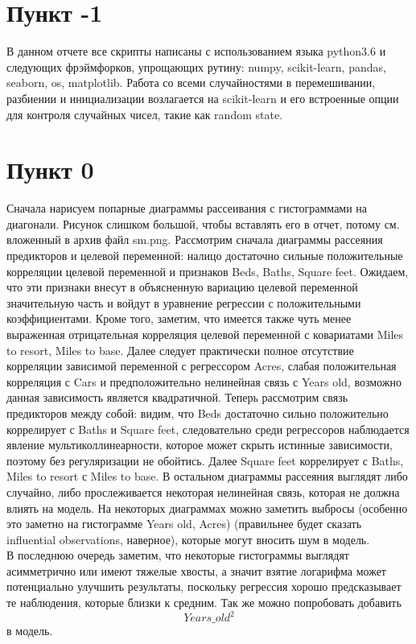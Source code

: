 \documentclass[a4paper, 12pt, oneside]{scrartcl}
\numberwithin{equation}{section}
\numberwithin{table}{section}
\numberwithin{figure}{section}
\begin{document}
\section{Пункт -1}
В данном отчете все скрипты написаны с использованием языка python3.6 и следующих фрэймфорков, упрощающих рутину: numpy, 
scikit-learn, pandas, seaborn, os, matplotlib. Работа со всеми случайностями в перемешивании, разбиении и инициализации 
возлагается на scikit-learn и его встроенные опции для контроля случайных чисел, такие как random state.

\section{Пункт 0}
Сначала нарисуем попарные диаграммы рассеивания с гистограммами на диагонали. Рисунок слишком большой, чтобы вставлять его в отчет, потому
см. вложенный в архив файл sm.png. Рассмотрим сначала диаграммы рассеяния предикторов и целевой переменной: налицо достаточно сильные 
положительные корреляции целевой переменной и признаков Beds, Baths, Square feet. Ожидаем, что эти признаки внесут в объясненную 
вариацию целевой переменной значительную часть и войдут в уравнение регрессии с положительными коэффициентами. Кроме того, 
заметим, что имеется также чуть менее выраженная отрицательная корреляция целевой переменной с ковариатами Miles to resort, Miles to base.
Далее следует практически полное отсутствие корреляции зависимой переменной с регрессором Acres, слабая положительная корреляция с Cars и
предположительно нелинейная связь с Years old, возможно данная зависимость является квадратичной. Теперь рассмотрим связь предикторов между 
собой: видим, что Beds достаточно сильно положительно коррелирует с Baths и Square feet, следовательно среди регрессоров наблюдается 
явление мультиколлинеарности, которое может скрыть истинные зависимости, поэтому без регуляризации не обойтись. Далее Square feet 
коррелирует с Baths, Miles to resort с Miles to base. В остальном диаграммы рассеяния выглядят либо случайно, либо прослеживается 
некоторая нелинейная связь, которая не должна влиять на модель. На некоторых диаграммах можно заметить выбросы (особенно это заметно 
на гистограмме Years old, Acres)
(правильнее будет сказать influential observations, наверное), которые могут 
вносить шум в модель. \\
В последнюю очередь заметим, что некоторые гистограммы выглядят асимметрично или имеют тяжелые хвосты, а значит взятие логарифма может 
потенциально улучшить результаты, поскольку регрессия хорошо предсказывает те наблюдения, которые близки к средним. Так же можно попробовать 
добавить $$ Years\_old^2  $$ в модель.
\end{document}
